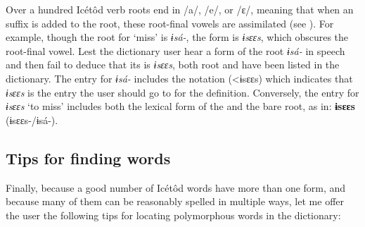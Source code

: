 
Over a hundred Icétôd verb roots end in /a/, /e/, or /ɛ/, meaning that when an  suffix is added to the root, these root-final vowels are assimilated (see ). For example, though the root for ‘miss’ is \textit{ɨsá-}, the  form is \textit{ɨsɛɛs}, which obscures the root-final vowel. Lest the dictionary user hear a form of the root \textit{ɨsá-} in speech and then fail to deduce that its  is \textit{ɨsɛɛs}, both root and  have been listed in the dictionary. The entry for \textit{ɨsá-} includes the notation (<ɨsɛɛs) which indicates that \textit{ɨsɛɛs }is the entry the user should go to for the definition. Conversely, the entry for \textit{ɨsɛɛs} ‘to miss’ includes both the lexical form of the  and the bare root, as in: \textbf{ɨsɛɛs}\textit{ }(ɨsɛɛs{\Í}-/ɨsá-). 
 
\subsection{Tips for finding words}\label{sec:1.3.3}

Finally, because a good number of Icétôd words have more than one form, and because many of them can be reasonably spelled in multiple ways, let me offer the user the following tips for locating polymorphous words in the dictionary:

